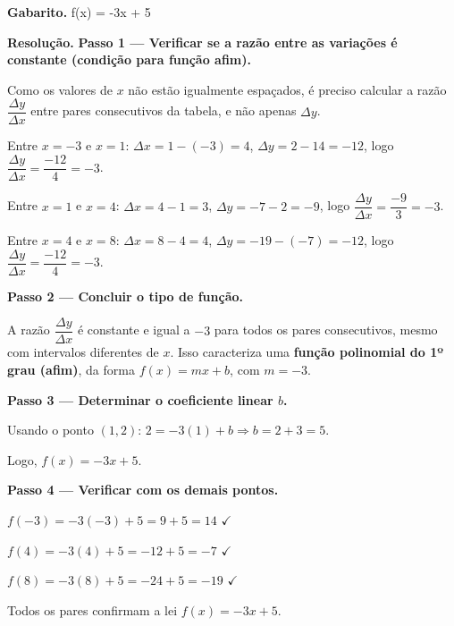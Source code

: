 \textbf{Gabarito.} f(x) = -3x + 5

\textbf{Resolução.} \textbf{Passo 1 — Verificar se a razão entre as variações é constante (condição para função afim).}

Como os valores de $x$ não estão igualmente espaçados, é preciso calcular a razão $\dfrac{\Delta y}{\Delta x}$ entre pares consecutivos da tabela, e não apenas $\Delta y$.

Entre $x=-3$ e $x=1$: $\Delta x = 1-(-3)=4$, $\Delta y = 2-14=-12$, logo $\dfrac{\Delta y}{\Delta x}=\dfrac{-12}{4}=-3$.

Entre $x=1$ e $x=4$: $\Delta x = 4-1=3$, $\Delta y = -7-2=-9$, logo $\dfrac{\Delta y}{\Delta x}=\dfrac{-9}{3}=-3$.

Entre $x=4$ e $x=8$: $\Delta x = 8-4=4$, $\Delta y = -19-(-7)=-12$, logo $\dfrac{\Delta y}{\Delta x}=\dfrac{-12}{4}=-3$.

\textbf{Passo 2 — Concluir o tipo de função.}

A razão $\dfrac{\Delta y}{\Delta x}$ é constante e igual a $-3$ para todos os pares consecutivos, mesmo com intervalos diferentes de $x$. Isso caracteriza uma \textbf{função polinomial do 1º grau (afim)}, da forma $f(x)=mx+b$, com $m=-3$.

\textbf{Passo 3 — Determinar o coeficiente linear $b$.}

Usando o ponto $(1,2)$: $2 = -3(1)+b \Rightarrow b = 2+3 = 5$.

Logo, $f(x) = -3x+5$.

\textbf{Passo 4 — Verificar com os demais pontos.}

$f(-3) = -3(-3)+5 = 9+5 = 14$ $\checkmark$

$f(4) = -3(4)+5 = -12+5 = -7$ $\checkmark$

$f(8) = -3(8)+5 = -24+5 = -19$ $\checkmark$

Todos os pares confirmam a lei $f(x) = -3x+5$.

